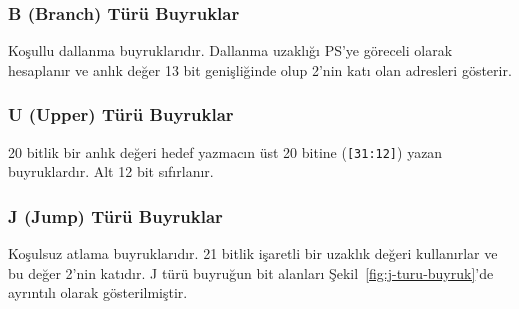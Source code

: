\subsubsection*{B (Branch) Türü Buyruklar} Koşullu dallanma buyruklarıdır. Dallanma uzaklığı PS'ye göreceli olarak hesaplanır ve anlık değer 13 bit genişliğinde olup 2'nin katı olan adresleri gösterir.

\subsubsection*{U (Upper) Türü Buyruklar} 20 bitlik bir anlık değeri hedef yazmacın üst 20 bitine (\texttt{[31:12]}) yazan buyruklardır. Alt 12 bit sıfırlanır.

\subsubsection*{J (Jump) Türü Buyruklar} Koşulsuz atlama buyruklarıdır. 21 bitlik işaretli bir uzaklık değeri kullanırlar ve bu değer 2'nin katıdır. J türü buyruğun bit alanları Şekil~\ref{fig:j-turu-buyruk}'de ayrıntılı olarak gösterilmiştir.

